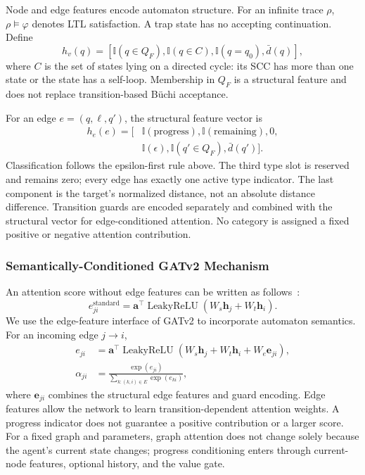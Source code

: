 \documentclass[journal]{IEEEtran}
\begin{document}
Node and edge features encode automaton structure. For an infinite trace $\rho$, $\rho\models\varphi$ denotes LTL satisfaction. A trap state has no accepting continuation. Define
\begin{equation}
\label{eq:node_features}
h_v(q)=[\mathbb I(q\in Q_F),\mathbb I(q\in C),\mathbb I(q=q_0),\bar d(q)],
\end{equation}
where $C$ is the set of states lying on a directed cycle: its SCC has more than one state or the state has a self-loop. Membership in $Q_F$ is a structural feature and does not replace transition-based B\"uchi acceptance.

For an edge $e=(q,\ell,q')$, the structural feature vector is
\begin{equation}
\label{eq:edge_features}
\begin{split}
h_e(e)=[&\mathbb I(\mathrm{progress}),\mathbb I(\mathrm{remaining}),0,\\
        &\mathbb I(\epsilon),\mathbb I(q'\in Q_F),\bar d(q')].
\end{split}
\end{equation}
Classification follows the epsilon-first rule above. The third type slot is reserved and remains zero; every edge has exactly one active type indicator. The last component is the target's normalized distance, not an absolute distance difference. Transition guards are encoded separately and combined with the structural vector for edge-conditioned attention. No category is assigned a fixed positive or negative attention contribution.

\subsubsection{Semantically-Conditioned GATv2 Mechanism}

An attention score without edge features can be written as follows~\citep{Brody2022}:
\begin{equation}
\label{eq:gat_standard}
e_{ji}^{\mathrm{standard}}=\mathbf a^\top\operatorname{LeakyReLU}
 (W_s\mathbf h_j+W_t\mathbf h_i).
\end{equation}
We use the edge-feature interface of GATv2 to incorporate automaton semantics. For an incoming edge $j\to i$,
\begin{align}
\label{eq:gat_semantic}
e_{ji}&=\mathbf a^\top\operatorname{LeakyReLU}
 (W_s\mathbf h_j+W_t\mathbf h_i+W_e\mathbf e_{ji}),\\
\alpha_{ji}&=\frac{\exp(e_{ji})}{\sum_{k:(k,i)\in E}\exp(e_{ki})},
\end{align}
where $\mathbf e_{ji}$ combines the structural edge features and guard encoding.
Edge features allow the network to learn transition-dependent attention weights. A progress indicator does not guarantee a positive contribution or a larger score. For a fixed graph and parameters, graph attention does not change solely because the agent's current state changes; progress conditioning enters through current-node features, optional history, and the value gate.
\end{document}
